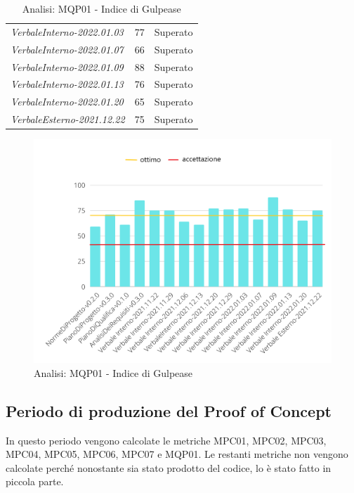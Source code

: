 \begin{table}[H]
\begin{tabular}{m{}<{\centering}  m{}<{\centering}  m{}<{\centering} }
            \textit{VerbaleInterno-2022.01.03}&
            77 &
            Superato \\
            
            \textit{VerbaleInterno-2022.01.07}&
            66 &
            Superato \\
            
            \textit{VerbaleInterno-2022.01.09}&
            88 &
            Superato \\
            
            \textit{VerbaleInterno-2022.01.13}&
            76 &
            Superato \\
            
            \textit{VerbaleInterno-2022.01.20}&
            65 &
            Superato \\

            \textit{VerbaleEsterno-2021.12.22}&
            75&
            Superato \\
            
    
    \end{tabular}
    \caption{Analisi: MQP01 - Indice di Gulpease}

	\begin{figure}[H]
        \centering
        \includegraphics[scale=0.50]{Sezioni/images/analisi-gulpease.png}
        \caption{Analisi: MQP01 - Indice di Gulpease}
    \end{figure}
\end{table}

\subsection{Periodo di produzione del Proof of Concept}
In questo periodo vengono calcolate le metriche MPC01, MPC02, MPC03, MPC04, MPC05, MPC06, MPC07 e MQP01. Le restanti metriche non vengono calcolate perché nonostante sia stato prodotto del codice, lo è stato fatto in piccola parte.
